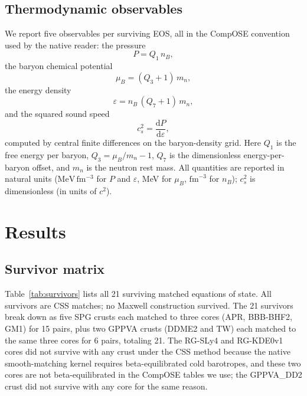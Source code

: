 \documentclass[aps,prc,reprint,notitlepage]{revtex4-2}
\begin{document}
\subsection{Thermodynamic observables}

We report five observables per surviving EOS, all in the CompOSE
convention used by the native reader: the pressure
\begin{equation}\label{eq:P}
    P = Q_1 \, n_B,
\end{equation}
the baryon chemical potential
\begin{equation}\label{eq:mub}
    \mu_B = (Q_3 + 1)\, m_n,
\end{equation}
the energy density
\begin{equation}\label{eq:eps}
    \varepsilon = n_B\, (Q_7 + 1)\, m_n,
\end{equation}
and the squared sound speed
\begin{equation}\label{eq:cs2}
    c_s^2 = \frac{\mathrm{d}P}{\mathrm{d}\varepsilon},
\end{equation}
computed by central finite differences on the baryon-density grid.  Here
$Q_1$ is the free energy per baryon, $Q_3 = \mu_B/m_n - 1$, $Q_7$ is the
dimensionless energy-per-baryon offset, and $m_n$ is the neutron rest mass.
All quantities are reported in natural units ($\mathrm{MeV\,fm^{-3}}$ for
$P$ and $\varepsilon$, MeV for $\mu_B$, $\mathrm{fm}^{-3}$ for $n_B$);
$c_s^2$ is dimensionless (in units of $c^2$).

\section{Results}\label{sec:results}

\subsection{Survivor matrix}

Table~\ref{tab:survivors} lists all 21 surviving matched equations of
state.  All survivors are CSS matches; no Maxwell construction survived.
The 21 survivors break down as five SPG crusts each matched to three cores
(APR, BBB-BHF2, GM1) for 15 pairs, plus two GPPVA crusts (DDME2 and TW)
each matched to the same three cores for 6 pairs, totaling 21.  The
RG-SLy4 and RG-KDE0v1 cores did not survive with any crust under the CSS
method because the native smooth-matching kernel requires beta-equilibrated
cold barotropes, and these two cores are not beta-equilibrated in the
CompOSE tables we use; the GPPVA\_DD2 crust did not survive with any core
for the same reason.
\end{document}
